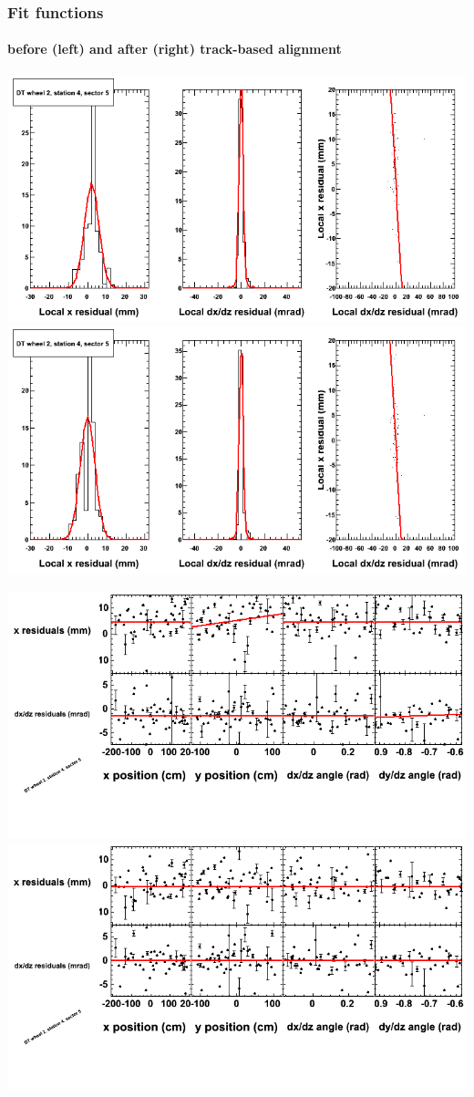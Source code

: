 \documentclass[compress]{beamer}
\begin{document}
\begin{frame}
\frametitle{Fit functions}
\framesubtitle{before (left) and after (right) track-based alignment}
\includegraphics[width=0.5\linewidth]{fitfunctions_re01/MBwhEst4sec05_bellcurves.png} \includegraphics[width=0.5\linewidth]{fitfunctions_re05/MBwhEst4sec05_bellcurves.png}

\includegraphics[width=0.5\linewidth]{fitfunctions_re01/MBwhEst4sec05_polynomials.png} \includegraphics[width=0.5\linewidth]{fitfunctions_re05/MBwhEst4sec05_polynomials.png}
\end{frame}
\end{document}
